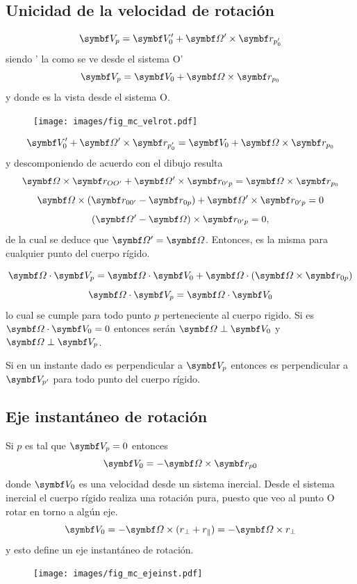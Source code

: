 \documentclass[10pt,oneside]{CBFT_book}
\begin{document}
\subsection{Unicidad de la velocidad de rotación}

\[
	\vb{V}_{p} = \vb{V}_0' + \vb{\Omega}' \times \vb{r}_{p_0'}
\]
siendo \vb{\Omega}' la \vb{\Omega} como se ve desde el sistema O'
\[
	\vb{V}_{p} = \vb{V}_0 + \vb{\Omega} \times \vb{r}_{p_0}
\]
y donde \vb{\Omega} es la vista desde el sistema O.
\begin{figure}[htb]
	\begin{center}
	\texttt{[image: images/fig\_mc\_velrot.pdf]}	 
	\end{center}
	\caption{}
\end{figure} 
\[
	\vb{V}_0' + \vb{\Omega}' \times \vb{r}_{p_0'} = \vb{V}_0 + \vb{\Omega} \times \vb{r}_{p_0} 
\]
y descomponiendo de acuerdo con el dibujo resulta 
\[
	\vb{\Omega} \times \vb{r}_{OO'} + \vb{\Omega}' \times \vb{r}_{0'p} = \vb{\Omega} \times \vb{r}_{p_0} 
\]
\[
	\vb{\Omega} \times ( \vb{r}_{00'} - \vb{r}_{0p} ) + \vb{\Omega}' \times \vb{r}_{0'p}  = 0
\]
\[
	( \vb{\Omega}' - \vb{\Omega}  ) \times \vb{r}_{0'p} = 0 ,
\]
de la cual se deduce que $\vb{\Omega}'=\vb{\Omega}$. Entonces, \vb{\Omega} es la misma para cualquier
punto del cuerpo rígido.

\[
	\vb{\Omega} \cdot \vb{V}_p = \vb{\Omega} \cdot \vb{V}_0  + \vb{\Omega}\cdot(\vb{\Omega}\times \vb{r}_{0p} )
\]
\[
	\vb{\Omega} \cdot \vb{V}_p = \vb{\Omega} \cdot \vb{V}_0
\]
lo cual se cumple para todo punto $p$ perteneciente al cuerpo rigido. Si es $\vb{\Omega} \cdot \vb{V}_0 = 0$
entonces serán $\vb{\Omega} \perp \vb{V}_0$ y $\vb{\Omega} \perp \vb{V}_p$.

Si en un instante dado \vb{\Omega} es perpendicular a $\vb{V}_p$ entonces \vb{\Omega} es perpendicular a 
$\vb{V}_{p'}$ para todo punto del cuerpo rígido.

\subsection{Eje instantáneo de rotación}

Si $p$ es tal que $\vb{V}_p = 0$ entonces
\[
	\vb{V}_0 = - \vb{\Omega} \times \vb{r}_{p0}
\]
donde $\vb{V}_0$ es una velocidad desde un sistema inercial.
Desde el sistema inercial el cuerpo rígido realiza una rotación pura, puesto que veo al
punto O rotar en torno a algún eje.
\[
	\vb{V}_0 = - \vb{\Omega} \times ( r_{\perp} + r_{\parallel} ) = -\vb{\Omega} \times  r_{\perp} 
\]
y esto define un eje instantáneo de rotación.
\begin{figure}[htb]
	\begin{center}
	\texttt{[image: images/fig\_mc\_ejeinst.pdf]}	 
	\end{center}
	\caption{}
\end{figure} 
\end{document}
